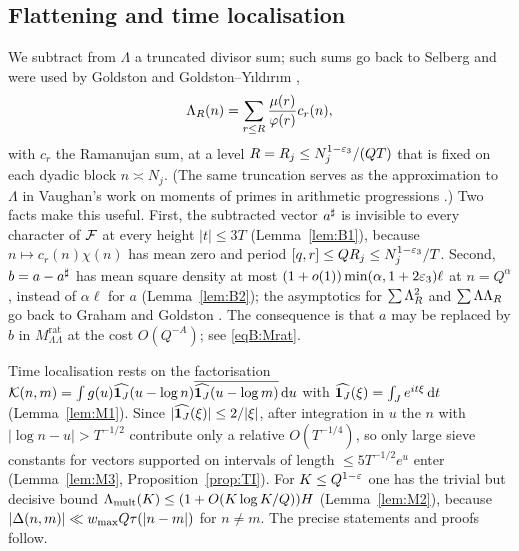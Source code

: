 \documentclass[11pt]{amsart}
\theoremstyle{definition}
\theoremstyle{remark}
\numberwithin{equation}{section}
\newcommand{\inputlemma}[1]{}
\begin{document}
\subsection{Flattening and time localisation}\label{sec:flat}
We subtract from $\Lambda$ a truncated divisor sum; such sums go back to Selberg \cite{Sel42} and were used by Goldston \cite{Gold92} and Goldston--Y{\i}ld{\i}r{\i}m \cite{GY03},
\[
\Lambda_{R}(n)=\sum_{r\le R}\frac{\mu(r)}{\varphi(r)}c_r(n),
\]
with $c_r$ the Ramanujan sum, at a level $R=R_j\le N_j^{1-\varepsilon_3}/(QT)$ that is fixed on each dyadic block $n\asymp N_j$. (The same truncation serves as the approximation to $\Lambda$ in Vaughan's work on moments of primes in arithmetic progressions \cite{Vau03a,Vau03b}.) Two facts make this useful. First, the subtracted vector $a^{\sharp}$ is invisible to every character of $\mathcal F$ at every height $|t|\le3T$ (Lemma~\ref{lem:B1}), because $n\mapsto c_r(n)\chi(n)$ has mean zero and period $[q,r]\le QR_j\le N_j^{1-\varepsilon_3}/T$. Second, $b=a-a^{\sharp}$ has mean square density at most $(1+o(1))\min(\alpha,1+2\varepsilon_3)\ell$ at $n=Q^\alpha$, instead of $\alpha\ell$ for $a$ (Lemma~\ref{lem:B2}); the asymptotics for $\sum\Lambda_{R}^2$ and $\sum\Lambda\Lambda_{R}$ go back to Graham \cite{Gra78} and Goldston \cite{Gold92}. The consequence is that $a$ may be replaced by $b$ in $M^{\mathrm{rat}}_{\Lambda\Lambda}$ at the cost $O(Q^{-A})$; see \eqref{eqB:Mrat}.

Time localisation rests on the factorisation $\mathcal K(n,m)=\int g(u)\widehat{\mathbf 1_J}(u-\log n)\overline{\widehat{\mathbf 1_J}(u-\log m)}\,\mathrm d u$ with $\widehat{\mathbf 1_J}(\xi)=\int_Je^{it\xi}\,\mathrm d t$ (Lemma~\ref{lem:M1}). Since $|\widehat{\mathbf 1_J}(\xi)|\le2/|\xi|$, after integration in $u$ the $n$ with $|\log n-u|>T^{-1/2}$ contribute only a relative $O(T^{-1/4})$, so only large sieve constants for vectors supported on intervals of length $\le5T^{-1/2}e^u$ enter (Lemma~\ref{lem:M3}, Proposition~\ref{prop:TI}). For $K\le Q^{1-\varepsilon}$ one has the trivial but decisive bound $\Lambda_{\mathrm{mult}}(K)\le(1+O(K\log K/Q))H$ (Lemma~\ref{lem:M2}), because $|\Delta(n,m)|\ll w_{\max} Q\tau(|n-m|)$ for $n\ne m$. The precise statements and proofs follow.

\inputlemma{lemma-B-majorant}
\end{document}

